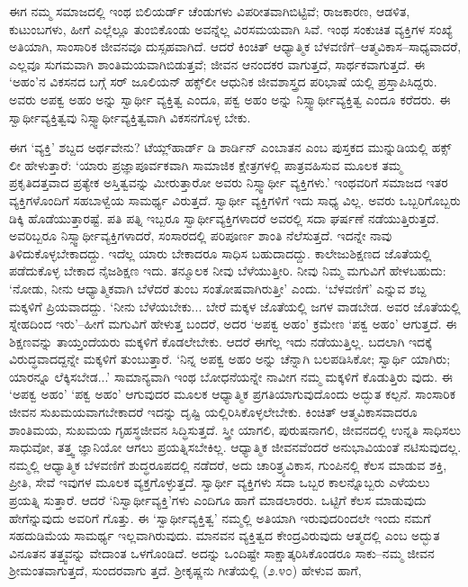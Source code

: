ಈಗ ನಮ್ಮ ಸಮಾಜದಲ್ಲಿ ಇಂಥ ಬಿಲಿಯರ್ಡ್ ಚೆಂಡುಗಳು ವಿಪರೀತವಾಗಿಬಿಟ್ಟಿವೆ; ರಾಜಕಾರಣ, ಆಡಳಿತ, ಕುಟುಂಬಗಳು, ಹೀಗೆ ಎಲ್ಲೆಲ್ಲೂ ತುಂಬಿಕೊಂಡು ಅವನ್ನೆಲ್ಲ ವಿರಸಮಯವಾಗಿ ಸಿವೆ. ಇಂಥ ಸಂಕುಚಿತ ವ್ಯಕ್ತಿಗಳ ಸಂಖ್ಯೆ ಅತಿಯಾಗಿ, ಸಾಂಸಾರಿಕ ಜೀವನವೂ ದುಸ್ಸಹವಾಗಿದೆ. ಆದರೆ ಕಿಂಚಿತ್ ಆಧ್ಯಾತ್ಮಿಕ ಬೆಳವಣಿಗೆ–ಆತ್ಮವಿಕಾಸ–ಸಾಧ್ಯವಾದರೆ, ಎಲ್ಲವೂ ಸುಗಮವಾಗಿ ಶಾಂತಿಮಯವಾಗಿಬಿಡುತ್ತವೆ; ಜೀವನ ಆನಂದಕರ ವಾಗುತ್ತದೆ, ಸಾರ್ಥಕವಾಗುತ್ತದೆ. ಈ ‘ಅಹಂ’ನ ವಿಕಸನದ ಬಗ್ಗೆ ಸರ್ ಜೂಲಿಯನ್ ಹಕ್ಸ್​ಲೀ ಆಧುನಿಕ ಜೀವಶಾಸ್ತ್ರದ ಪರಿಭಾಷೆ ಯಲ್ಲಿ ಪ್ರಸ್ತಾಪಿಸಿದ್ದರು. ಅವರು ಅಪಕ್ವ ಅಹಂ ಅನ್ನು ಸ್ವಾರ್ಥೀ ವ್ಯಕ್ತಿತ್ವ  ಎಂದೂ, ಪಕ್ವ ಅಹಂ ಅನ್ನು ನಿಸ್ಸ್ವಾರ್ಥೀವ್ಯಕ್ತಿತ್ವ  ಎಂದೂ ಕರೆದರು. ಈ ಸ್ವಾರ್ಥೀವ್ಯಕ್ತಿತ್ವವು ನಿಸ್ಸ್ವಾರ್ಥೀವ್ಯಕ್ತಿತ್ವವಾಗಿ ವಿಕಸನಗೊಳ್ಳ ಬೇಕು.

ಈಗ ‘ವ್ಯಕ್ತಿ’ ಶಬ್ದದ ಅರ್ಥವೇನು? ಟೆಯ್ಲ್​ಹಾರ್ಡ್ ಡಿ ಶಾರ್ಡಿನ್ ಎಂಬಾತನ  ಎಂಬ ಪುಸ್ತಕದ ಮುನ್ನುಡಿಯಲ್ಲಿ ಹಕ್ಸ್​ಲೀ ಹೇಳುತ್ತಾರೆ: ‘ಯಾರು ಪ್ರಜ್ಞಾಪೂರ್ವಕವಾಗಿ ಸಾಮಾಜಿಕ ಕ್ಷೇತ್ರಗಳಲ್ಲಿ ಪಾತ್ರವಹಿಸುವ ಮೂಲಕ ತಮ್ಮ ಪ್ರಕೃತಿದತ್ತವಾದ ಪ್ರತ್ಯೇಕ ಅಸ್ತಿತ್ವವನ್ನು ಮೀರುತ್ತಾರೋ ಅವರು ನಿಸ್ಸ್ವಾರ್ಥೀ ವ್ಯಕ್ತಿಗಳು.’ ಇಂಥವರಿಗೆ ಸಮಾಜದ ಇತರ ವ್ಯಕ್ತಿಗಳೊಂದಿಗೆ ಸಹಬಾಳ್ವೆಯ ಸಾಮರ್ಥ್ಯ ವಿರುತ್ತದೆ. ಸ್ವಾರ್ಥೀ ವ್ಯಕ್ತಿಗಳಿಗೆ  ಇದು ಸಾಧ್ಯ ವಿಲ್ಲ. ಅವರು ಒಬ್ಬರಿಗೊಬ್ಬರು ಡಿಕ್ಕಿ ಹೊಡೆಯುತ್ತಾರಷ್ಟೆ. ಪತಿ ಪತ್ನಿ ಇಬ್ಬರೂ ಸ್ವಾರ್ಥೀವ್ಯಕ್ತಿಗಳಾದರೆ ಅವರಲ್ಲಿ ಸದಾ ಘರ್ಷಣೆ ನಡೆಯುತ್ತಿರುತ್ತದೆ. ಅವರಿಬ್ಬರೂ ನಿಸ್ಸ್ವಾರ್ಥೀವ್ಯಕ್ತಿಗಳಾದರೆ, ಸಂಸಾರದಲ್ಲಿ ಪರಿಪೂರ್ಣ ಶಾಂತಿ ನೆಲೆಸುತ್ತದೆ. ಇದನ್ನೇ ನಾವು ತಿಳಿದುಕೊಳ್ಳಬೇಕಾದದ್ದು. ಇದೆಲ್ಲ ಯಾರು ಬೇಕಾದರೂ ಸಾಧಿಸ ಬಹುದಾದದ್ದು. ಕಾಲೇಜುಶಿಕ್ಷಣದ ಜೊತೆಯಲ್ಲಿ ಪಡೆದುಕೊಳ್ಳ ಬೇಕಾದ ನೈಜಶಿಕ್ಷಣ ಇದು. ತನ್ಮೂಲಕ ನೀವು ಬೆಳೆಯುತ್ತೀರಿ. ನೀವು ನಿಮ್ಮ ಮಗುವಿಗೆ ಹೇಳಬಹುದು: ‘ನೋಡು, ನೀನು ಆಧ್ಯಾತ್ಮಿಕವಾಗಿ ಬೆಳೆದರೆ ತುಂಬ ಸಂತೋಷವಾಗಿರುತ್ತೀ’ ಎಂದು. ‘ಬೆಳವಣಿಗೆ’ ಎನ್ನುವ ಶಬ್ದ ಮಕ್ಕಳಿಗೆ ಪ್ರಿಯವಾದದ್ದು. ‘ನೀನು ಬೆಳೆಯಬೇಕು... ಬೇರೆ ಮಕ್ಕಳ ಜೊತೆಯಲ್ಲಿ ಜಗಳ ವಾಡಬೇಡ. ಅವರ ಜೊತೆಯಲ್ಲಿ ಸ್ನೇಹದಿಂದ ಇರು’–ಹೀಗೆ ಮಗುವಿಗೆ ಹೇಳುತ್ತ ಬಂದರೆ, ಅದರ ‘ಅಪಕ್ವ ಅಹಂ’ ಕ್ರಮೇಣ ‘ಪಕ್ವ ಅಹಂ’ ಆಗುತ್ತದೆ. ಈ ಶಿಕ್ಷಣವನ್ನು ತಾಯ್ತಂದೆಯರು ಮಕ್ಕಳಿಗೆ ಕೊಡಲೇಬೇಕು. ಆದರೆ ಈಗೆಲ್ಲ ಇದು ನಡೆಯುತ್ತಿಲ್ಲ. ಬದಲಾಗಿ ಇದಕ್ಕೆ ವಿರುದ್ಧವಾದದ್ದನ್ನೇ ಮಕ್ಕಳಿಗೆ ತುಂಬುತ್ತಾರೆ. ‘ನಿನ್ನ ಅಪಕ್ವ ಅಹಂ ಅನ್ನು ಚೆನ್ನಾಗಿ ಬಲಪಡಿಸಿಕೋ; ಸ್ವಾರ್ಥಿ ಯಾಗಿರು; ಯಾರನ್ನೂ ಲೆಕ್ಕಿಸಬೇಡ...’ ಸಾಮಾನ್ಯವಾಗಿ ಇಂಥ ಬೋಧನೆಯನ್ನೇ ನಾವೀಗ ನಮ್ಮ ಮಕ್ಕಳಿಗೆ ಕೊಡುತ್ತಿರು ವುದು. ಈ ‘ಅಪಕ್ವ ಅಹಂ’ ‘ಪಕ್ವ ಅಹಂ’ ಆಗುವುದರ ಮೂಲಕ ಆಧ್ಯಾತ್ಮಿಕ ಪ್ರಗತಿಯಾಗುವುದೊಂದು ಅದ್ಭುತ ಕಲ್ಪನೆ. ಸಾಂಸಾರಿಕ ಜೀವನ ಸುಖಮಯವಾಗಬೇಕಾದರೆ ಇದನ್ನು ದೃಷ್ಟಿ ಯಲ್ಲಿರಿಸಿಕೊಳ್ಳಲೇಬೇಕು. ಕಿಂಚಿತ್ ಆತ್ಮವಿಕಾಸವಾದರೂ ಶಾಂತಿಮಯ, ಸುಖಮಯ ಗೃಹಸ್ಥಜೀವನ ಸಿದ್ಧಿಸುತ್ತದೆ. ಸ್ತ್ರೀ ಯಾಗಲಿ, ಪುರುಷನಾಗಲಿ, ಜೀವನದಲ್ಲಿ ಉನ್ನತಿ ಸಾಧಿಸಲು ಸಾಧುವೋ, ತತ್ತ್ವ ಜ್ಞಾನಿಯೋ ಆಗಲು ಪ್ರಯತ್ನಿಸಬೇಕಿಲ್ಲ. ಆಧ್ಯಾತ್ಮಿಕ ಜೀವನವೆಂದರೆ ಅನುಭಾವಿಯಂತೆ ನಟಿಸುವುದಲ್ಲ. ನಮ್ಮಲ್ಲಿ ಆಧ್ಯಾತ್ಮಿಕ ಬೆಳವಣಿಗೆ ಶುದ್ಧರೂಪದಲ್ಲಿ ನಡೆದರೆ, ಅದು ಚಾರಿತ್ರ್ಯವಿಕಾಸ, ಗುಂಪಿನಲ್ಲಿ ಕೆಲಸ ಮಾಡುವ ಶಕ್ತಿ, ಪ್ರೀತಿ, ಸೇವೆ ಇವುಗಳ ಮೂಲಕ ವ್ಯಕ್ತಗೊಳ್ಳುತ್ತದೆ. ಸ್ವಾರ್ಥೀ ವ್ಯಕ್ತಿಗಳು ಸದಾ ಒಬ್ಬರ ಕಾಲನ್ನೊಬ್ಬರು ಎಳೆಯಲು ಪ್ರಯತ್ನಿ ಸುತ್ತಾರೆ. ಆದರೆ ‘ನಿಸ್ವಾರ್ಥೀವ್ಯಕ್ತಿ’ಗಳು ಎಂದಿಗೂ ಹಾಗೆ ಮಾಡಲಾರರು. ಒಟ್ಟಿಗೆ ಕೆಲಸ ಮಾಡುವುದು ಹೇಗೆನ್ನುವುದು ಅವರಿಗೆ ಗೊತ್ತು. ಈ ‘ಸ್ವಾರ್ಥೀವ್ಯಕ್ತಿತ್ವ’ ನಮ್ಮಲ್ಲಿ ಅತಿಯಾಗಿ ಇರುವುದರಿಂದಲೇ ಇಂದು ನಮಗೆ ಸಹದುಡಿಮೆಯ ಸಾಮರ್ಥ್ಯ ಇಲ್ಲವಾಗಿರುವುದು. ಮಾನವನ ವ್ಯಕ್ತಿತ್ವದ ಕೇಂದ್ರವಿರುವುದು ಆತ್ಮದಲ್ಲಿ ಎಂಬ ಅದ್ಭುತ ವಿನೂತನ ತತ್ತ್ವವನ್ನು ವೇದಾಂತ ಒಳಗೊಂಡಿದೆ. ಅದನ್ನು ಒಂದಿಷ್ಟೇ ಸಾಕ್ಷಾತ್ಕರಿಸಿಕೊಂಡರೂ ಸಾಕು–ನಮ್ಮ ಜೀವನ ಶ್ರೀಮಂತವಾಗುತ್ತದೆ, ಸುಂದರವಾಗು ತ್ತದೆ. ಶ್ರೀಕೃಷ್ಣನು ಗೀತೆಯಲ್ಲಿ (೨.೪೦) ಹೇಳುವ ಹಾಗೆ,

